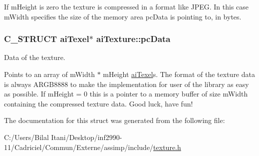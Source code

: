 If m\+Height is zero the texture is compressed in a format like J\+P\+EG. In this case m\+Width specifies the size of the memory area pc\+Data is pointing to, in bytes. 
\subsubsection[{\texorpdfstring{pc\+Data}{pcData}}]{\setlength{\rightskip}{0pt plus 5cm}C\+\_\+\+S\+T\+R\+U\+CT {\bf ai\+Texel}$\ast$ ai\+Texture\+::pc\+Data}\hypertarget{structai_texture_aeb07528748b6e49d2d81c60006024f9a}{}\label{structai_texture_aeb07528748b6e49d2d81c60006024f9a}
Data of the texture.

Points to an array of m\+Width $\ast$ m\+Height \hyperlink{structai_texel}{ai\+Texel}\textquotesingle{}s. The format of the texture data is always A\+R\+G\+B8888 to make the implementation for user of the library as easy as possible. If m\+Height = 0 this is a pointer to a memory buffer of size m\+Width containing the compressed texture data. Good luck, have fun! 

The documentation for this struct was generated from the following file\+:\begin{DoxyCompactItemize}
\item 
C\+:/\+Users/\+Bilal Itani/\+Desktop/inf2990-\/11/\+Cadriciel/\+Commun/\+Externe/assimp/include/\hyperlink{texture_8h}{texture.\+h}\end{DoxyCompactItemize}
